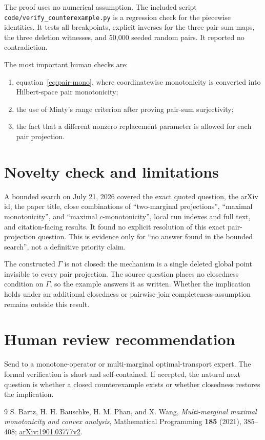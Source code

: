 \documentclass[11pt]{article}
\begin{document}
The proof uses no numerical assumption.  The included script
\texttt{code/verify\_counterexample.py} is a regression check for the
piecewise identities.  It tests all breakpoints, explicit inverses for the
three pair-sum maps, the three deletion witnesses, and 50,000 seeded random
pairs.  It reported no contradiction.

The most important human checks are:
\begin{enumerate}
\item equation~\eqref{eq:pair-mono}, where coordinatewise monotonicity is
      converted into Hilbert-space pair monotonicity;
\item the use of Minty's range criterion after proving pair-sum surjectivity;
\item the fact that a different nonzero replacement parameter is allowed for
      each pair projection.
\end{enumerate}

\section{Novelty check and limitations}

A bounded search on July 21, 2026 covered the exact quoted question, the arXiv
id, the paper title, close combinations of ``two-marginal projections'',
``maximal monotonicity'', and ``maximal \(c\)-monotonicity'', local run indexes
and full text, and citation-facing results.  It found no explicit resolution
of this exact pair-projection question.  This is evidence only for ``no answer
found in the bounded search'', not a definitive priority claim.

The constructed \(\Gamma\) is not closed: the mechanism is a single deleted
global point invisible to every pair projection.  The source question places
no closedness condition on \(\Gamma\), so the example answers it as written.
Whether the implication holds under an additional closedness or pairwise-join
completeness assumption remains outside this result.

\section{Human review recommendation}

Send to a monotone-operator or multi-marginal optimal-transport expert.  The
formal verification is short and self-contained.  If accepted, the natural
next question is whether a closed counterexample exists or whether closedness
restores the implication.

\begin{thebibliography}{9}
S. Bartz, H. H. Bauschke, H. M. Phan, and X. Wang,
\emph{Multi-marginal maximal monotonicity and convex analysis},
Mathematical Programming \textbf{185} (2021), 385--408;
\href{https://arxiv.org/abs/1901.03777}{arXiv:1901.03777v2}.
\end{thebibliography}
\end{document}
